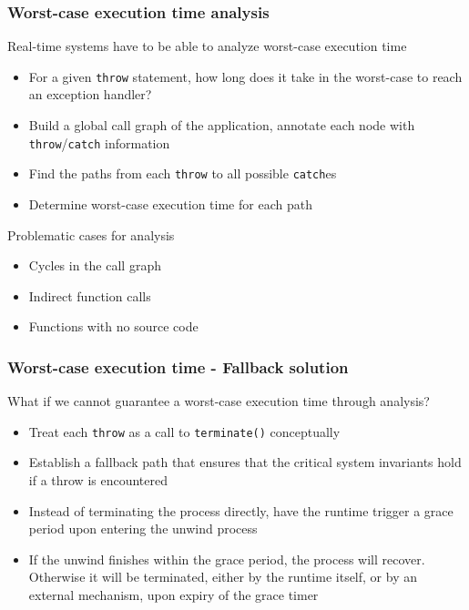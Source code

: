 \documentclass[aspectratio=169]{beamer}
\begin{document}
\begin{frame}

  \frametitle{Worst-case execution time analysis}

  Real-time systems have to be able to analyze worst-case execution time
  
  \pause
  \begin{itemize}
  \item For a given \texttt{throw} statement, how long does it take in the worst-case to reach an exception handler?
  \item Build a global call graph of the application, annotate each node with \texttt{throw}/\texttt{catch} information
  \item Find the paths from each \texttt{throw} to all possible \texttt{catch}es
  \item Determine worst-case execution time for each path
  \end{itemize}

  \pause 
  Problematic cases for analysis
  \begin{itemize}
  \pause \item Cycles in the call graph
  \pause \item Indirect function calls
  \pause \item Functions with no source code
  \end{itemize}
\end{frame}


\begin{frame}
\frametitle{Worst-case execution time - Fallback solution}

What if we cannot guarantee a worst-case execution time through analysis?

\begin{itemize}
\pause \item Treat each \texttt{throw} as a call to \texttt{terminate()} conceptually
\pause \item Establish a fallback path that ensures that the critical system invariants hold if a throw is encountered
\pause \item Instead of terminating the process directly, have the runtime trigger a grace period upon entering the unwind process
\pause \item If the unwind finishes within the grace period, the process will recover. Otherwise it will be terminated, either by the runtime itself, or by an external mechanism, upon expiry of the grace timer
\end{itemize}

\end{frame}
\end{document}
